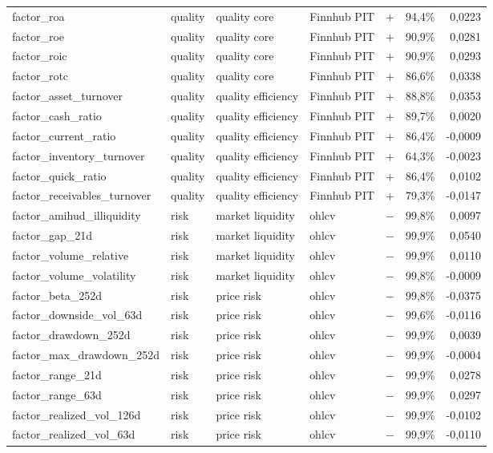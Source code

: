 \begin{longtable}{p{4.0cm}p{1.7cm}p{3.0cm}p{2.0cm}rrr}
factor\_roa & quality & quality core & Finnhub PIT & + & 94,4\% & 0,0223 \\
factor\_roe & quality & quality core & Finnhub PIT & + & 90,9\% & 0,0281 \\
factor\_roic & quality & quality core & Finnhub PIT & + & 90,9\% & 0,0293 \\
factor\_rotc & quality & quality core & Finnhub PIT & + & 86,6\% & 0,0338 \\
factor\_asset\_turnover & quality & quality efficiency & Finnhub PIT & + & 88,8\% & 0,0353 \\
factor\_cash\_ratio & quality & quality efficiency & Finnhub PIT & + & 89,7\% & 0,0020 \\
factor\_current\_ratio & quality & quality efficiency & Finnhub PIT & + & 86,4\% & -0,0009 \\
factor\_inventory\_turnover & quality & quality efficiency & Finnhub PIT & + & 64,3\% & -0,0023 \\
factor\_quick\_ratio & quality & quality efficiency & Finnhub PIT & + & 86,4\% & 0,0102 \\
factor\_receivables\_turnover & quality & quality efficiency & Finnhub PIT & + & 79,3\% & -0,0147 \\
factor\_amihud\_illiquidity & risk & market liquidity & ohlcv & − & 99,8\% & 0,0097 \\
factor\_gap\_21d & risk & market liquidity & ohlcv & − & 99,9\% & 0,0540 \\
factor\_volume\_relative & risk & market liquidity & ohlcv & − & 99,9\% & 0,0110 \\
factor\_volume\_volatility & risk & market liquidity & ohlcv & − & 99,8\% & -0,0009 \\
factor\_beta\_252d & risk & price risk & ohlcv & − & 99,8\% & -0,0375 \\
factor\_downside\_vol\_63d & risk & price risk & ohlcv & − & 99,6\% & -0,0116 \\
factor\_drawdown\_252d & risk & price risk & ohlcv & − & 99,9\% & 0,0039 \\
factor\_max\_drawdown\_252d & risk & price risk & ohlcv & − & 99,9\% & -0,0004 \\
factor\_range\_21d & risk & price risk & ohlcv & − & 99,9\% & 0,0278 \\
factor\_range\_63d & risk & price risk & ohlcv & − & 99,9\% & 0,0297 \\
factor\_realized\_vol\_126d & risk & price risk & ohlcv & − & 99,9\% & -0,0102 \\
factor\_realized\_vol\_63d & risk & price risk & ohlcv & − & 99,9\% & -0,0110 \\

\end{longtable}
